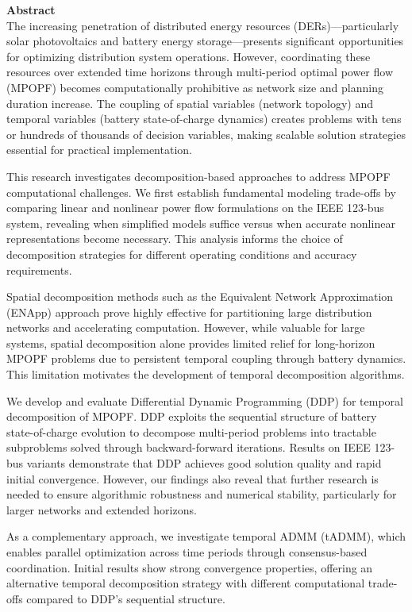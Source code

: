 \textbf{\centering \large Abstract \\}
The increasing penetration of distributed energy resources (DERs)—particularly solar photovoltaics and battery energy storage—presents significant opportunities for optimizing distribution system operations. However, coordinating these resources over extended time horizons through multi-period optimal power flow (MPOPF) becomes computationally prohibitive as network size and planning duration increase. The coupling of spatial variables (network topology) and temporal variables (battery state-of-charge dynamics) creates problems with tens or hundreds of thousands of decision variables, making scalable solution strategies essential for practical implementation.

This research investigates decomposition-based approaches to address MPOPF computational challenges. We first establish fundamental modeling trade-offs by comparing linear and nonlinear power flow formulations on the IEEE 123-bus system, revealing when simplified models suffice versus when accurate nonlinear representations become necessary. This analysis informs the choice of decomposition strategies for different operating conditions and accuracy requirements.

Spatial decomposition methods such as the Equivalent Network Approximation (ENApp) approach prove highly effective for partitioning large distribution networks and accelerating computation. However, while valuable for large systems, spatial decomposition alone provides limited relief for long-horizon MPOPF problems due to persistent temporal coupling through battery dynamics. This limitation motivates the development of temporal decomposition algorithms.

We develop and evaluate Differential Dynamic Programming (DDP) for temporal decomposition of MPOPF. DDP exploits the sequential structure of battery state-of-charge evolution to decompose multi-period problems into tractable subproblems solved through backward-forward iterations. Results on IEEE 123-bus variants demonstrate that DDP achieves good solution quality and rapid initial convergence. However, our findings also reveal that further research is needed to ensure algorithmic robustness and numerical stability, particularly for larger networks and extended horizons.

As a complementary approach, we investigate temporal ADMM (tADMM), which enables parallel optimization across time periods through consensus-based coordination. Initial results show strong convergence properties, offering an alternative temporal decomposition strategy with different computational trade-offs compared to DDP's sequential structure.

